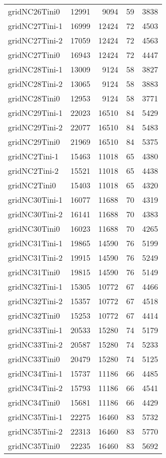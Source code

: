 \begin{tabular}{lrrrr}
gridNC26Tini0 & 12991 & 9094 & 59 & 3838 \\
gridNC27Tini-1 & 16999 & 12424 & 72 & 4503 \\
gridNC27Tini-2 & 17059 & 12424 & 72 & 4563 \\
gridNC27Tini0 & 16943 & 12424 & 72 & 4447 \\
gridNC28Tini-1 & 13009 & 9124 & 58 & 3827 \\
gridNC28Tini-2 & 13065 & 9124 & 58 & 3883 \\
gridNC28Tini0 & 12953 & 9124 & 58 & 3771 \\
gridNC29Tini-1 & 22023 & 16510 & 84 & 5429 \\
gridNC29Tini-2 & 22077 & 16510 & 84 & 5483 \\
gridNC29Tini0 & 21969 & 16510 & 84 & 5375 \\
gridNC2Tini-1 & 15463 & 11018 & 65 & 4380 \\
gridNC2Tini-2 & 15521 & 11018 & 65 & 4438 \\
gridNC2Tini0 & 15403 & 11018 & 65 & 4320 \\
gridNC30Tini-1 & 16077 & 11688 & 70 & 4319 \\
gridNC30Tini-2 & 16141 & 11688 & 70 & 4383 \\
gridNC30Tini0 & 16023 & 11688 & 70 & 4265 \\
gridNC31Tini-1 & 19865 & 14590 & 76 & 5199 \\
gridNC31Tini-2 & 19915 & 14590 & 76 & 5249 \\
gridNC31Tini0 & 19815 & 14590 & 76 & 5149 \\
gridNC32Tini-1 & 15305 & 10772 & 67 & 4466 \\
gridNC32Tini-2 & 15357 & 10772 & 67 & 4518 \\
gridNC32Tini0 & 15253 & 10772 & 67 & 4414 \\
gridNC33Tini-1 & 20533 & 15280 & 74 & 5179 \\
gridNC33Tini-2 & 20587 & 15280 & 74 & 5233 \\
gridNC33Tini0 & 20479 & 15280 & 74 & 5125 \\
gridNC34Tini-1 & 15737 & 11186 & 66 & 4485 \\
gridNC34Tini-2 & 15793 & 11186 & 66 & 4541 \\
gridNC34Tini0 & 15681 & 11186 & 66 & 4429 \\
gridNC35Tini-1 & 22275 & 16460 & 83 & 5732 \\
gridNC35Tini-2 & 22313 & 16460 & 83 & 5770 \\
gridNC35Tini0 & 22235 & 16460 & 83 & 5692 \\

\end{tabular}
